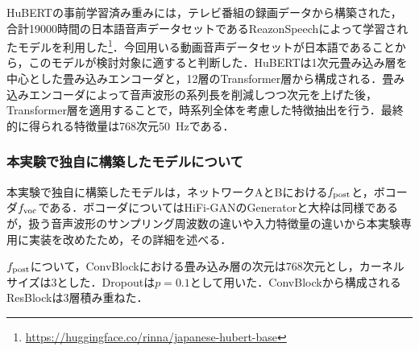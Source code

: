 HuBERTの事前学習済み重みには，テレビ番組の録画データから構築された，合計19000時間の日本語音声データセットであるReazonSpeech\cite{yin2023reazonspeech}によって学習されたモデル\cite{sawada2024release}を利用した\footnote{\url{https://huggingface.co/rinna/japanese-hubert-base}}．今回用いる動画音声データセットが日本語であることから，このモデルが検討対象に適すると判断した．HuBERTは1次元畳み込み層を中心とした畳み込みエンコーダと，12層のTransformer層から構成される．畳み込みエンコーダによって音声波形の系列長を削減しつつ次元を上げた後，Transformer層を適用することで，時系列全体を考慮した特徴抽出を行う．最終的に得られる特徴量は768次元\SI{50}{\Hz}である．

\subsubsection{本実験で独自に構築したモデルについて}
本実験で独自に構築したモデルは，ネットワークAとBにおける$f_{\text{post}}$と，ボコーダ$f_{\text{voc}}$である．ボコーダについてはHiFi-GANのGeneratorと大枠は同様であるが，扱う音声波形のサンプリング周波数の違いや入力特徴量の違いから本実験専用に実装を改めたため，その詳細を述べる．

$f_{\text{post}}$について，ConvBlockにおける畳み込み層の次元は768次元とし，カーネルサイズは3とした．Dropoutは$p = 0.1$として用いた．ConvBlockから構成されるResBlockは3層積み重ねた．

